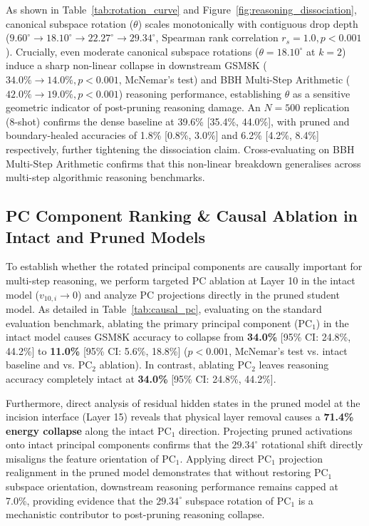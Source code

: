 \documentclass[11pt]{article}
\begin{document}
As shown in Table~\ref{tab:rotation_curve} and Figure~\ref{fig:reasoning_dissociation}, canonical subspace rotation ($\theta$) scales monotonically with contiguous drop depth ($9.60^\circ \!\to\! 18.10^\circ \!\to\! 22.27^\circ \!\to\! 29.34^\circ$, Spearman rank correlation $r_s = 1.0, p < 0.001$). Crucially, even moderate canonical subspace rotations ($\theta = 18.10^\circ$ at $k=2$) induce a sharp non-linear collapse in downstream GSM8K ($34.0\% \!\to\! 14.0\%, p < 0.001$, McNemar's test) and BBH Multi-Step Arithmetic ($42.0\% \!\to\! 19.0\%, p < 0.001$) reasoning performance, establishing $\theta$ as a sensitive geometric indicator of post-pruning reasoning damage. An $N=500$ replication (8-shot) confirms the dense baseline at 39.6\% [35.4\%, 44.0\%], with pruned and boundary-healed accuracies of 1.8\% [0.8\%, 3.0\%] and 6.2\% [4.2\%, 8.4\%] respectively, further tightening the dissociation claim. Cross-evaluating on BBH Multi-Step Arithmetic confirms that this non-linear breakdown generalises across multi-step algorithmic reasoning benchmarks.

\subsection{PC Component Ranking \& Causal Ablation in Intact and Pruned Models}

To establish whether the rotated principal components are causally important for multi-step reasoning, we perform targeted PC ablation at Layer 10 in the intact model ($v_{10,i} \to 0$) and analyze PC projections directly in the pruned student model. As detailed in Table~\ref{tab:causal_pc}, evaluating on the standard evaluation benchmark, ablating the primary principal component ($\mathrm{PC}_1$) in the intact model causes GSM8K accuracy to collapse from \textbf{34.0\%} [95\% CI: 24.8\%, 44.2\%] to \textbf{11.0\%} [95\% CI: 5.6\%, 18.8\%] ($p < 0.001$, McNemar's test vs. intact baseline and vs. $\mathrm{PC}_2$ ablation). In contrast, ablating $\mathrm{PC}_2$ leaves reasoning accuracy completely intact at \textbf{34.0\%} [95\% CI: 24.8\%, 44.2\%].

Furthermore, direct analysis of residual hidden states in the pruned model at the incision interface (Layer 15) reveals that physical layer removal causes a \textbf{71.4\% energy collapse} along the intact $\mathrm{PC}_1$ direction. Projecting pruned activations onto intact principal components confirms that the $29.34^\circ$ rotational shift directly misaligns the feature orientation of $\mathrm{PC}_1$. Applying direct $\mathrm{PC}_1$ projection realignment in the pruned model demonstrates that without restoring $\mathrm{PC}_1$ subspace orientation, downstream reasoning performance remains capped at 7.0\%, providing evidence that the $29.34^\circ$ subspace rotation of $\mathrm{PC}_1$ is a mechanistic contributor to post-pruning reasoning collapse.
\end{document}
